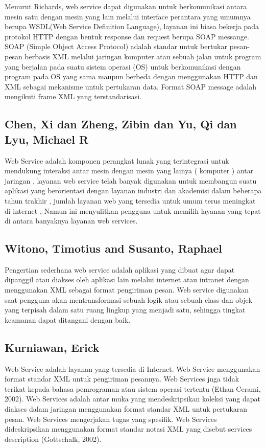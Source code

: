 \documentclass[12pt]{journal}
\begin{document}
Menurut Richards, web service dapat digunakan untuk berkomunikasi antara mesin satu dengan mesin yang lain melalui interface perantara yang umumnya berupa WSDL(Web Service Definition Language), layanan ini biasa bekerja pada protokol HTTP dengan bentuk response dan request berupa SOAP messange. SOAP (Simple Object Access Protocol) adalah standar untuk bertukar pesan-pesan berbasis XML melalui jaringan komputer atau sebuah jalan untuk program yang berjalan pada suatu sistem operasi (OS) untuk berkomunikasi dengan program pada OS yang sama maupun berbeda dengan menggunakan HTTP dan XML sebagai mekanisme untuk pertukaran data. Format SOAP message adalah mengikuti frame XML yang terstandarisasi\cite{ihya2011pembuatan}. 

\subsection{Chen, Xi dan Zheng, Zibin dan Yu, Qi dan Lyu, Michael R}

Web Service adalah komponen perangkat lunak yang terintegrasi untuk mendukung interaksi antar mesin dengan mesin yang lainya ( komputer ) antar jaringan , layanan web service telah banyak digunakan untuk membangun suatu aplikasi yang berorientasi dengan layanan industri dan akademisi dalam beberapa tahun trakhir , jumlah layanan web yang tersedia untuk umum terus meningkat di internet , Namun  ini menyulitkan pengguna untuk memilih layanan yang tepat di antara banyaknya layanan web services\cite{chen2014web}.

\subsection{Witono, Timotius and Susanto, Raphael}

Pengertian sederhana web service adalah aplikasi yang dibuat agar dapat dipanggil atau diakses oleh aplikasi lain melalui internet atau intranet dengan menggunakan XML sebagai format pengiriman pesan. Web service digunakan saat pengguna akan mentransformasi sebuah logik atau sebuah class dan objek yang terpisah dalam satu ruang lingkup yang menjadi satu, sehingga tingkat keamanan dapat ditangani dengan baik\cite{witono201511}.



\subsection{Kurniawan, Erick}

Web Service adalah layanan yang tersedia di Internet. Web Service menggunakan format standar XML untuk pengiriman pesannya. Web Services juga tidak terikat kepada bahasa pemrograman atau sistem operasi tertentu (Ethan Cerami, 2002). Web Services adalah antar muka yang mendeskripsikan koleksi yang dapat diakses dalam jaringan menggunakan format standar XML untuk pertukaran pesan. Web Services mengerjakan tugas yang spesifik. Web Services dideskripsikan menggunakan format standar notasi XML yang disebut services description (Gottschalk, 2002)\cite{chen2014web}.
\end{document}
